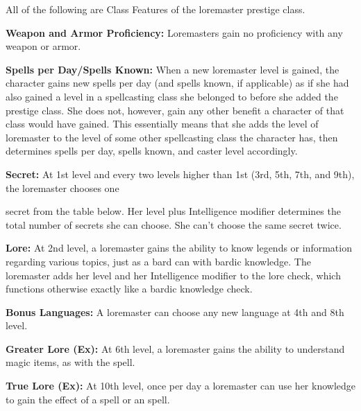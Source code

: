 \ClassFeatures

All of the following are Class Features of the loremaster prestige class.

\textbf{Weapon and Armor Proficiency:} Loremasters gain no proficiency with any 
weapon or armor.

\textbf{Spells per Day/Spells Known:} When a new loremaster level is gained, the 
character gains new spells per day (and spells known, if applicable) as if she 
had also gained a level in a spellcasting class she belonged to before she added 
the prestige class. She does not, however, gain any other benefit a character of 
that class would have gained. This essentially means that she adds the level of 
loremaster to the level of some other spellcasting class the character has, then 
determines spells per day, spells known, and caster level accordingly.

\textbf{Secret:} At 1st level and every two levels higher than 1st (3rd, 5th, 7th, 
and 9th), the loremaster chooses one

secret from the table below. Her level plus Intelligence modifier determines the 
total number of secrets she can choose. She can't choose the same secret twice.

\textbf{Lore:} At 2nd level, a loremaster gains the ability to know legends or 
information regarding various topics, just as a bard can with bardic knowledge. 
The loremaster adds her level and her Intelligence modifier to the lore check, 
which functions otherwise exactly like a bardic knowledge check.

\textbf{Bonus Languages:} A loremaster can choose any new language at 4th and 8th 
level.

\textbf{Greater Lore (Ex):} At 6th level, a loremaster gains the ability to understand 
magic items, as with the  spell.

\textbf{True Lore (Ex):} At 10th level, once per day a loremaster can use her knowledge 
to gain the effect of a  spell or an  spell.

